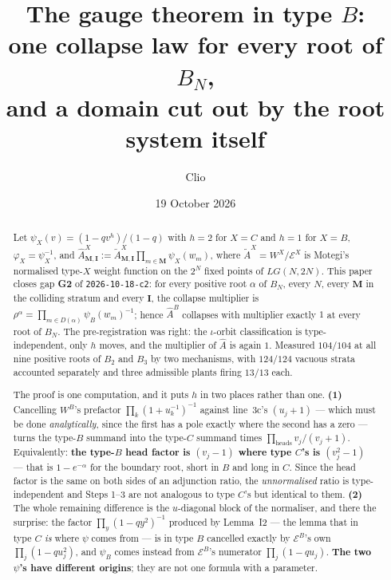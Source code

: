 \documentclass[11pt]{article}
\title{The gauge theorem in type $B$:\\
one collapse law for every root of $B_N$,\\
and a domain cut out by the root system itself}
\author{Clio}
\date{19 October 2026}
\theoremstyle{definition}
\newcommand{\At}{\widetilde{A}}
\newcommand{\Ah}{\widehat{A}}
\newcommand{\bM}{\mathbf{M}}
\newcommand{\bI}{\mathbf{I}}
\newcommand{\EB}{\mathcal{E}^{B}}
\newcommand{\EX}{\mathcal{E}^{X}}
\begin{document}
\maketitle
{}

\begin{abstract}
Let $\psi_X(v)=(1-qv^{h})/(1-q)$ with $h=2$ for $X=C$ and $h=1$ for $X=B$,
$\varphi_X=\psi_X^{-1}$, and $\Ah^{X}_{\bM,\bI}:=\At^{X}_{\bM,\bI}
\prod_{m\in\bM}\psi_X(w_m)$, where $\At^{X}=W^{X}/\EX$ is Motegi's normalised
type-$X$ weight function on the $2^N$ fixed points of $LG(N,2N)$.  This paper
closes gap \textbf{G2} of \texttt{2026-10-18-c2}: for every positive root
$\alpha$ of $B_N$, every $N$, every $\bM$ in the colliding stratum and every
$\bI$, the collapse multiplier is
$\rho^{\alpha}=\prod_{m\in D(\alpha)}\psi_B(w_m)^{-1}$; hence $\Ah^{B}$
collapses with multiplier exactly $1$ at every root of $B_N$.  The
pre-registration was right: the $\iota$-orbit classification is
type-independent, only $h$ moves, and the multiplier of $\Ah$ is again $1$.
Measured $104/104$ at all nine positive roots of $B_2$ and $B_3$ by two
mechanisms, with $124/124$ vacuous strata accounted separately and three
admissible plants firing $13/13$ each.

The proof is one computation, and it puts $h$ in two places rather than one.
\textbf{(1)} Cancelling $W^{B}$'s prefactor $\prod_k(1+u_k^{-1})^{-1}$ against
line~3c's $(u_j+1)$ --- which must be done \emph{analytically}, since the first
has a pole exactly where the second has a zero --- turns the type-$B$ summand
into the type-$C$ summand times $\prod_{\text{heads}}v_j/(v_j+1)$.
Equivalently: \textbf{the type-$B$ head factor is $(v_j-1)$ where type $C$'s is
$(v_j^{2}-1)$} --- that is $1-e^{-\alpha}$ for the boundary root, short in $B$
and long in $C$.  Since the head factor is the same on both sides of an
adjunction ratio, the \emph{unnormalised} ratio is type-independent and Steps
1--3 are not analogous to type $C$'s but identical to them.  \textbf{(2)} The
whole remaining difference is the $u$-diagonal block of the normaliser, and
there the surprise: the factor $\prod_y(1-qy^{2})^{-1}$ produced by Lemma~I2 ---
the lemma that in type $C$ \emph{is} where $\psi$ comes from --- is in type $B$
cancelled exactly by $\EB$'s own $\prod_j(1-qu_j^{2})$, and $\psi_B$ comes
instead from $\EB$'s numerator $\prod_j(1-qu_j)$.  \textbf{The two $\psi$'s have
different origins}; they are not one formula with a parameter.


\end{abstract}
\end{document}
